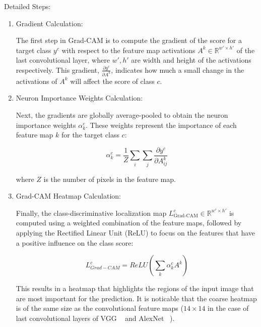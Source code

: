 \documentclass{article}
\begin{document}
Detailed Steps:
\begin{enumerate}

    \item Gradient Calculation:
    
    The first step in Grad-CAM is to compute the gradient of the score for a target class $y^c$ with respect to the feature map activations $A^k \in \mathds{R}^{w' \times h'}$ of the last convolutional layer, where $w',h'$ are width and height of the activations respectively. This gradient, $\frac{\partial y^c}{\partial A^k}$, indicates how much a small change in the activations of $A^k$ will affect the score of class $c$.

    
    \item Neuron Importance Weights Calculation:
    
    Next, the gradients are globally average-pooled to obtain the neuron importance weights $\alpha^c_k$. These weights represent the importance of each feature map $k$ for the target class $c$:
    
    \begin{equation}
        \alpha^c_k = \dfrac{1}{Z}\sum_{i} \sum_{j} \dfrac{\partial y^c}{\partial A^k_{ij}}
    \end{equation}
    
    where $Z$ is the number of pixels in the feature map.


    \item Grad-CAM Heatmap Calculation:
    
    Finally, the class-discriminative localization map $L^c_{\text{Grad-CAM}} \in \mathds{R}^{w' \times h'}$ is computed using a weighted combination of the feature maps, followed by applying the Rectified Linear Unit (ReLU) to focus on the features that have a positive influence on the class score:

    \begin{equation}
        L_{Grad-CAM}^{c} = ReLU ( \sum_{k} \alpha^c_k A^k )
    \end{equation}
    
    This results in a heatmap that highlights the regions of the input image that are most important for the prediction. It is noticable that the coarse heatmap is of the same size as the convolutional feature maps ($14 \times 14$ in the case of last convolutional layers of VGG ~\cite{simonyan2015deep} and AlexNet ~\cite{krizhevsky2012}).

\end{enumerate}
\end{document}
